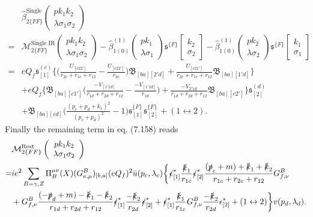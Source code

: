 \begin{align}
&\hat{\beta}^\text{Single}_{2\{FF\}}\left(
\begin{array}{c}
pk_1k_2\\\lambda\sigma_1\sigma_2
\end{array}\right)\nonumber\\
=&\mathcal{M}^\text{Single IR}_{2\{FF\}}\left(
\begin{array}{c}
pk_1k_2\\\lambda\sigma_1\sigma_2
\end{array}\right)-\hat{\beta}^{(1)}_{1(0)}\left(
\begin{array}{c}
pk_1\\\lambda\sigma_1
\end{array}\right)\mathfrak{s}^{\{F\}}\left[\begin{array}{c}
k_2\\\sigma_2
\end{array}\right]-\hat{\beta}^{(1)}_{1(0)}\left(
\begin{array}{c}
pk_2\\\lambda\sigma_2
\end{array}\right)\mathfrak{s}^{\{F\}}\left[\begin{array}{c}
k_1\\\sigma_1
\end{array}\right]\nonumber\\
=&eQ_f\mathfrak{s}^{(c)}_{[1]}\biggl\{ \biggl( \frac{U_{[c22']}}{r_{2c}+r_{1c}+r_{12}}-\frac{U_{[c22']}}{r_{2c}} \biggr)\mathfrak{B}_{[ba][2'd]}+\frac{U_{[c21']}}{r_{2c}+r_{1c}+r_{12}}\mathfrak{B}_{[ba][1'd]} \biggr\}\nonumber\\
&+eQ_f\biggl\{\mathfrak{B}_{[ba][c1']}\biggl( \frac{-V_{[1'1d]}}{r_{1d}+r_{2d}+r_{12}}-\frac{-V_{[1'1d]}}{r_{1d}}\biggr)+\frac{-V_{2'1d}}{r_{1d}+r_{2d}+r_{12}}\mathfrak{B}_{[ba][c2']}  \biggr\}\mathfrak{s}^{(d)}_{[2]}\nonumber\\
&+\mathfrak{B}_{[ba][cd]}\biggl( \frac{(p_c+p_d+k_1)^2}{(p_c+p_d)^2}-1 \biggr)\mathfrak{s}^{\{F\}}_{[1]}\mathfrak{s}^{\{F\}}_{[2]}+(1\leftrightarrow 2).
\end{align}
Finally the remaining term in eq. (7.158) reads
\begin{align}
&\mathcal{M}^\text{Rest}_{2\{FF\}}\left(\begin{array}{c}
pk_1k_2\\\lambda\sigma_1\sigma_2
\end{array}\right)\nonumber\\
=&ie^2\sum_{B=\gamma,Z}\Pi_B^{\mu\nu}(X)(G^B_{e,\mu})_{[b,a]}(eQ_f)^2\bar{u}(p_c,\lambda_c)\biggl\{\slashed \epsilon^\ast_{[1]}\frac{\slashed k_1}{r_{1c}}\slashed \epsilon^\ast_{[2]}\frac{(\slashed p_c+m)+\slashed k_1+\slashed k_2}{r_{1c}+r_{2c}+r_{12}}G^B_{f,\nu}  \nonumber\\
&+G^B_{f,\nu}\frac{(-\slashed p_d+m)-\slashed k_1-\slashed k_2}{r_{1d}+r_{2d}+r_{12}}\slashed \epsilon^\ast_{[1]}\frac{-\slashed k_2}{r_{2d}}\slashed \epsilon^\ast_{[2]}+\slashed\epsilon^\ast_{[1]}\frac{\slashed k_1}{r_{1c}}G^B_{f,\nu}\frac{-\slashed k_2}{r_{2d}}\epsilon^\ast_{[2]}+(1\leftrightarrow 2)
\biggr\}v(p_d,\lambda_d).\nonumber\\
\end{align}
